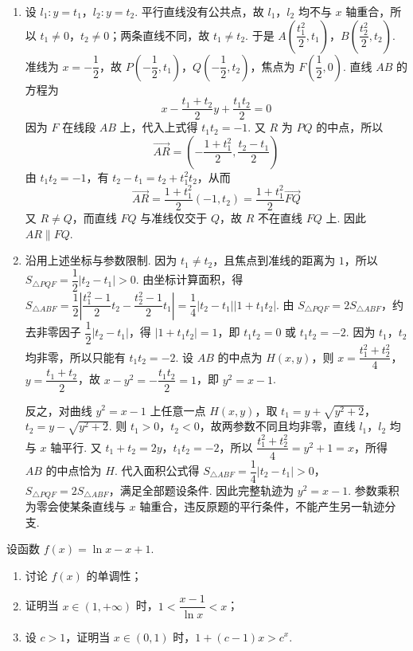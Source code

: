 \begin{solution}
\begin{enumerate}
\item 设 \(l_1:y=t_1\)，\(l_2:y=t_2\). 平行直线没有公共点，故 \(l_1\)，\(l_2\) 均不与 \(x\) 轴重合，所以 \(t_1\ne0\)，\(t_2\ne0\)；两条直线不同，故 \(t_1\ne t_2\). 于是 \(A\left(\dfrac{t_1^2}{2},t_1\right)\)，\(B\left(\dfrac{t_2^2}{2},t_2\right)\). 准线为 \(x=-\dfrac12\)，故 \(P\left(-\dfrac12,t_1\right)\)，\(Q\left(-\dfrac12,t_2\right)\)，焦点为 \(F\left(\dfrac12,0\right)\). 直线 \(AB\) 的方程为
\[
x-\frac{t_1+t_2}{2}y+\frac{t_1t_2}{2}=0
\]
因为 \(F\) 在线段 \(AB\) 上，代入上式得 \(t_1t_2=-1\). 又 \(R\) 为 \(PQ\) 的中点，所以
\[
\overrightarrow{AR}=\left(-\frac{1+t_1^2}{2},\frac{t_2-t_1}{2}\right)
\]
由 \(t_1t_2=-1\)，有 \(t_2-t_1=t_2+t_1^2t_2\)，从而
\[
\overrightarrow{AR}=\frac{1+t_1^2}{2}(-1,t_2)=\frac{1+t_1^2}{2}\overrightarrow{FQ}
\]
又 \(R\ne Q\)，而直线 \(FQ\) 与准线仅交于 \(Q\)，故 \(R\) 不在直线 \(FQ\) 上. 因此 \(AR\parallel FQ\).
\item 沿用上述坐标与参数限制. 因为 \(t_1\ne t_2\)，且焦点到准线的距离为 \(1\)，所以 \(S_{\triangle PQF}=\dfrac12\left|t_2-t_1\right|>0\). 由坐标计算面积，得 \(S_{\triangle ABF}=\dfrac12\left|\dfrac{t_1^2-1}{2}t_2-\dfrac{t_2^2-1}{2}t_1\right|=\dfrac14\left|t_2-t_1\right|\left|1+t_1t_2\right|\). 由 \(S_{\triangle PQF}=2S_{\triangle ABF}\)，约去非零因子 \(\dfrac12\left|t_2-t_1\right|\)，得 \(\left|1+t_1t_2\right|=1\)，即 \(t_1t_2=0\) 或 \(t_1t_2=-2\). 因为 \(t_1\)，\(t_2\) 均非零，所以只能有 \(t_1t_2=-2\). 设 \(AB\) 的中点为 \(H(x,y)\)，则 \(x=\dfrac{t_1^2+t_2^2}{4}\)，\(y=\dfrac{t_1+t_2}{2}\)，故 \(x-y^2=-\dfrac{t_1t_2}{2}=1\)，即 \(y^2=x-1\).

反之，对曲线 \(y^2=x-1\) 上任意一点 \(H(x,y)\)，取 \(t_1=y+\sqrt{y^2+2}\)，\(t_2=y-\sqrt{y^2+2}\). 则 \(t_1>0\)，\(t_2<0\)，故两参数不同且均非零，直线 \(l_1\)，\(l_2\) 均与 \(x\) 轴平行. 又 \(t_1+t_2=2y\)，\(t_1t_2=-2\)，所以 \(\dfrac{t_1^2+t_2^2}{4}=y^2+1=x\)，所得 \(AB\) 的中点恰为 \(H\). 代入面积公式得 \(S_{\triangle ABF}=\dfrac14\left|t_2-t_1\right|>0\)，\(S_{\triangle PQF}=2S_{\triangle ABF}\)，满足全部题设条件. 因此完整轨迹为 \(y^2=x-1\). 参数乘积为零会使某条直线与 \(x\) 轴重合，违反原题的平行条件，不能产生另一轨迹分支.
\end{enumerate}
\end{solution}

\begin{problem}
设函数 \(f(x)=\ln x-x+1\).

\begin{enumerate}
\item 讨论 \(f(x)\) 的单调性；
\item 证明当 \(x\in(1,+\infty)\) 时，\(1<\dfrac{x-1}{\ln x}<x\)；
\item 设 \(c>1\)，证明当 \(x\in(0,1)\) 时，\(1+(c-1)x>c^x\).
\end{enumerate}
\end{problem}

